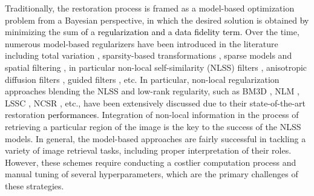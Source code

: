 \documentclass[10pt,journal,compsoc]{IEEEtran}
\newcommand{\sd}{\textcolor{black}}
\newcommand{\dk}{\textcolor{black}}
\begin{document}
Traditionally, the restoration process is framed as a model-based optimization problem from a Bayesian perspective, in which the desired solution is obtained \dk{by} minimizing the sum \dk{of} a
\sd{regularization and a data fidelity term.} Over the time, numerous model-based regularizers have been introduced in the literature including total variation \cite{Osher2005Iterative}, sparsity-based transformations \cite{donoho1994ideal}, sparse models \cite{Elad2006image, Aharon2006an, Dong2013nonlocally}
and spatial filtering \cite{tomasi1998bilateral, Durand2002fast}, in particular non-local self-similarity (NLSS) filters \cite{buades2005review, Mairal2009nonlocal}, anisotropic diffusion filters \cite{Perona1990scale, Yongjian2002speckle}, guided filters \cite{He2013guided}, etc.
In particular, non-local regularization approaches \cite{Dong2011image, Sun2011Gradient, Dong2013nonlocally, Teodoro2016image} blending the NLSS and low-rank regularity, such as BM3D \cite{Dabov2007Image},
NLM \cite{buades2005review}, LSSC \cite{Mairal2009nonlocal}, NCSR \cite{Dong2013nonlocally},
etc., have been extensively discussed due to their state-of-the-art restoration \dk{performances}. Integration of non-local information in the process of retrieving a particular region of the image is the key to the success of the NLSS models.
In general, the model-based approaches are fairly successful in tackling a variety of image retrieval tasks, including proper interpretation of their roles. However, these schemes require conducting a costlier computation process and manual tuning of several hyperparameters, which are the primary challenges of these strategies.
\end{document}
